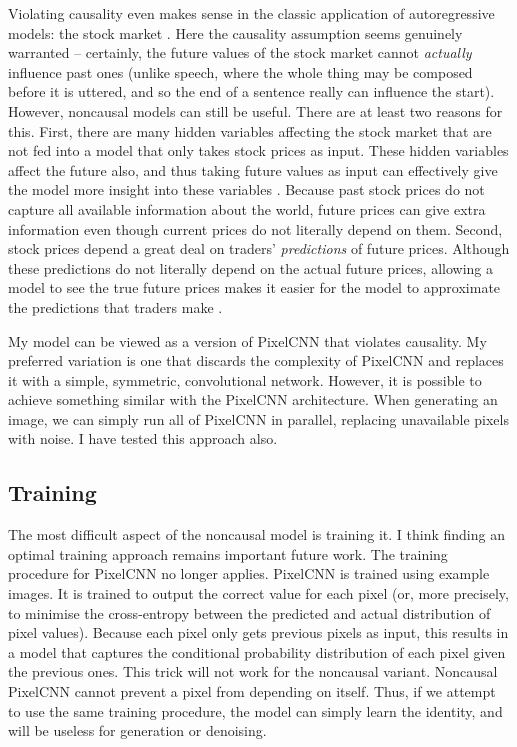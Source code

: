 \documentclass[11pt, a4paper, openany]{book}
\begin{document}
Violating causality even makes sense in the classic application of autoregressive models: the stock market \citep{noncausaleco1}. Here the causality assumption seems genuinely warranted -- certainly, the future values of the stock market cannot \emph{actually} influence past ones (unlike speech, where the whole thing may be composed before it is uttered, and so the end of a sentence really can influence the start). However, noncausal models can still be useful. There are at least two reasons for this. First, there are many hidden variables affecting the stock market that are not fed into a model that only takes stock prices as input. These hidden variables affect the future also, and thus taking future values as input can effectively give the model more insight into these variables \citep{noncausaleco1}. Because past stock prices do not capture all available information about the world, future prices can give extra information even though current prices do not literally depend on them. Second, stock prices depend a great deal on traders' \emph{predictions} of future prices. Although these predictions do not literally depend on the actual future prices, allowing a model to see the true future prices makes it easier for the model to approximate the predictions that traders make \citep{noncausaleco1}.

My model can be viewed as a version of PixelCNN that violates causality. My preferred variation is one that discards the complexity of PixelCNN and replaces it with a simple, symmetric, convolutional network. However, it is possible to achieve something similar with the PixelCNN architecture. When generating an image, we can simply run all of PixelCNN in parallel, replacing unavailable pixels with noise. I have tested this approach also.

\subsection{Training}

The most difficult aspect of the noncausal model is training it. I think finding an optimal training approach remains important future work. The training procedure for PixelCNN no longer applies. PixelCNN is trained using example images. It is trained to output the correct value for each pixel (or, more precisely, to minimise the cross-entropy between the predicted and actual distribution of pixel values). Because each pixel only gets previous pixels as input, this results in a model that captures the conditional probability distribution of each pixel given the previous ones. This trick will not work for the noncausal variant. Noncausal PixelCNN cannot prevent a pixel from depending on itself. Thus, if we attempt to use the same training procedure, the model can simply learn the identity, and will be useless for generation or denoising.
\end{document}
